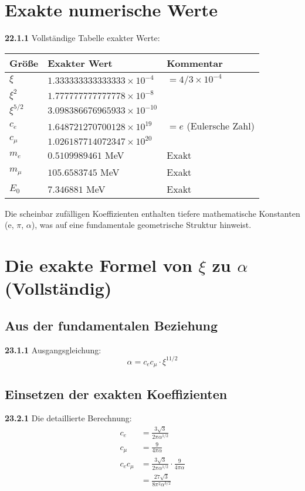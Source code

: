 \documentclass[12pt,a4paper]{article}
\begin{document}
\section{Exakte numerische Werte}

\noindent \textbf{22.1.1} Vollständige Tabelle exakter Werte:

\begin{table}[h]
	\centering
	\begin{tabular}{lll}
		\toprule
		Größe & Exakter Wert & Kommentar \\
		\midrule
		$\xi$ & $1.333333333333333 \times 10^{-4}$ & $= 4/3 \times 10^{-4}$ \\
		$\xi^2$ & $1.777777777777778 \times 10^{-8}$ & \\
		$\xi^{5/2}$ & $3.098386676965933 \times 10^{-10}$ & \\
		$c_e$ & $1.648721270700128 \times 10^{19}$ & $= e$ (Eulersche Zahl) \\
		$c_\mu$ & $1.026187714072347 \times 10^{20}$ & \\
		$m_e$ & $0.5109989461$ MeV & Exakt \\
		$m_\mu$ & $105.6583745$ MeV & Exakt \\
		$E_0$ & $7.346881$ MeV & Exakt \\
		\bottomrule
	\end{tabular}
\end{table}

Die scheinbar zufälligen Koeffizienten enthalten tiefere mathematische Konstanten (e, $\pi$, $\alpha$), was auf eine fundamentale geometrische Struktur hinweist.

\section{Die exakte Formel von $\xi$ zu $\alpha$ (Vollständig)}

\subsection{Aus der fundamentalen Beziehung}
\noindent \textbf{23.1.1} Ausgangsgleichung:
\begin{equation}
	\alpha = c_e c_\mu \cdot \xi^{11/2}
\end{equation}

\subsection{Einsetzen der exakten Koeffizienten}
\noindent \textbf{23.2.1} Die detaillierte Berechnung:
\begin{align}
	c_e &= \frac{3\sqrt{3}}{2\pi\alpha^{1/2}} \\
	c_\mu &= \frac{9}{4\pi\alpha} \\
	c_e c_\mu &= \frac{3\sqrt{3}}{2\pi\alpha^{1/2}} \cdot \frac{9}{4\pi\alpha} \\
	&= \frac{27\sqrt{3}}{8\pi^2\alpha^{3/2}}
\end{align}
\end{document}
